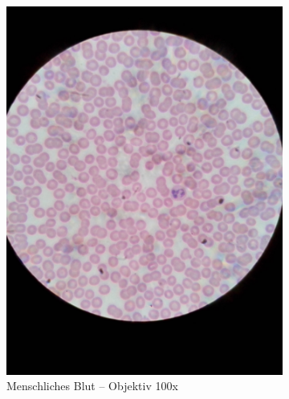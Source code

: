 \begin{figure}[h!]
	\begin{subfigure}[b]{0.3\textwidth}
		\includegraphics[width=1\textwidth]{../images/01_human_blood.jpg}
		\caption{Menschliches Blut -- Objektiv 100x}
	\end{subfigure}
	\begin{subfigure}[b]{0.3\textwidth}

\end{subfigure}
\end{figure}
